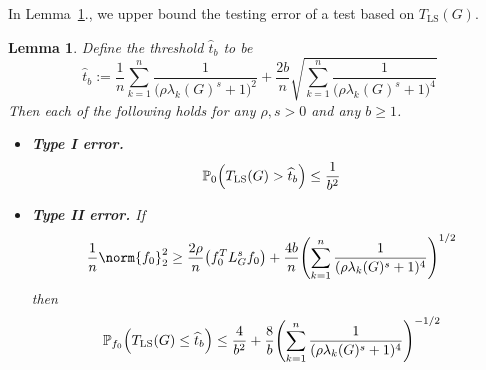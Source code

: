 \documentclass[twoside]{article}
\newcommand{\1}{\mathbf{1}}
\newcommand{\Lap}{L}
\newcommand{\Pbb}{\mathbb{P}}
\newcommand{\wh}[1]{\widehat{#1}}
\newcommand{\LS}{\mathrm{LS}}
\newtheorem{lemma}{Lemma}
\theoremstyle{definition}
\theoremstyle{remark}
\begin{document}
In Lemma~\ref{lem:ls_fixed_graph_testing}., we upper bound the testing error of a test based on $T_{\LS}(G)$.
\begin{lemma}
	\label{lem:ls_fixed_graph_testing}
	Define the threshold $\wh{t}_b$ to be
	\begin{equation*}
	\wh{t}_b := \frac{1}{n}\sum_{k = 1}^{n} \frac{1}{\bigl(\rho \lambda_k(G)^s + 1\bigr)^2} + \frac{2b}{n}\sqrt{\sum_{k = 1}^{n} \frac{1}{\bigl(\rho \lambda_k(G)^s + 1\bigr)^4}}
	\end{equation*}
	Then each of the following holds for any $\rho,s > 0$ and any $b \geq 1$.
	\begin{itemize}
		\item \textbf{Type I error.}
		\begin{equation}
		\label{eqn:ls_fixed_graph_testing_typeI}
		\Pbb_0\Bigl(T_{\LS}(G) > \wh{t}_b\Bigr) \leq \frac{1}{b^2}
		\end{equation}
		\item \textbf{Type II error.} If
		\begin{equation}
		\label{eqn:ls_fixed_graph_testing_critical_radius}
		\frac{1}{n}\norm{f_0}_2^2 \geq \frac{2 \rho}{n} \bigl(f_0^T \Lap_G^s f_0\bigr) + \frac{4b}{n} \Biggl(\sum_{k = 1}^{n} \frac{1}{(\rho\lambda_k(G)^s + 1)^4} \Biggr)^{1/2}
		\end{equation}
		then
		\begin{equation}
		\label{eqn:ls_fixed_graph_testing_typeII}
		\Pbb_{f_0}\Bigl(T_{\LS}(G) \leq \wh{t}_b\Bigr) \leq \frac{4}{b^2} + \frac{8}{b} \Biggl(\sum_{k = 1}^{n} \frac{1}{(\rho\lambda_k(G)^s + 1)^4} \Biggr)^{-1/2}
		\end{equation}
	\end{itemize}
\end{lemma}
\end{document}
